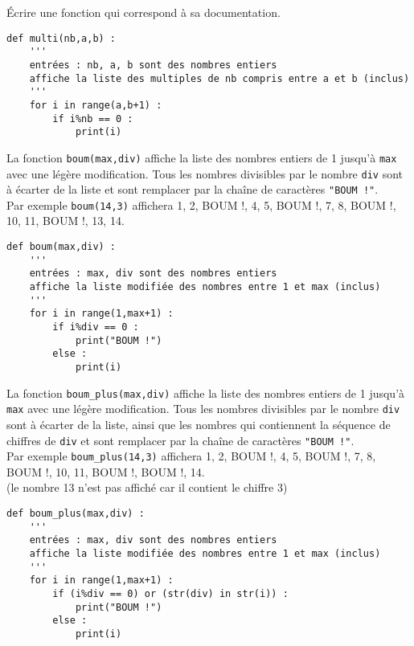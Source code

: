 \begin{cor}
\begin{multicols}{2}
Écrire une fonction qui correspond à sa documentation.\\
\columnbreak
\begin{lstlisting}
def multi(nb,a,b) :
	'''
	entrées : nb, a, b sont des nombres entiers
	affiche la liste des multiples de nb compris entre a et b (inclus)
	'''
	for i in range(a,b+1) :
		if i%nb == 0 :
			print(i)
\end{lstlisting}
\end{multicols}
\end{cor}

\begin{cor}[1 2 3 BOUM! (*)]
\begin{multicols}{2}
La fonction \texttt{boum(max,div)} affiche la liste des nombres entiers de 1 jusqu'à \texttt{max} avec une légère modification. Tous les nombres divisibles par le nombre \texttt{div} sont à écarter de la liste et sont remplacer par la chaîne de caractères \texttt{"BOUM !"}.\\
Par exemple \texttt{boum(14,3)} affichera 1, 2, BOUM !, 4, 5, BOUM !, 7, 8, BOUM !, 10, 11, BOUM !, 13, 14.\\
\columnbreak
\begin{lstlisting}
def boum(max,div) :
	'''
	entrées : max, div sont des nombres entiers
	affiche la liste modifiée des nombres entre 1 et max (inclus)
	'''
	for i in range(1,max+1) :
		if i%div == 0 :
			print("BOUM !")
		else :
			print(i)
\end{lstlisting}
\end{multicols}
\end{cor}

\begin{cor}[1 2 3 BOUM! (***)]
\begin{multicols}{2}
La fonction \texttt{boum\_plus(max,div)} affiche la liste des nombres entiers de 1 jusqu'à \texttt{max} avec une légère modification. Tous les nombres divisibles par le nombre \texttt{div} sont à écarter de la liste, ainsi que les nombres qui contiennent la séquence de chiffres de \texttt{div} et sont remplacer par la chaîne de caractères \texttt{"BOUM !"}.\\
Par exemple \texttt{boum\_plus(14,3)} affichera 1, 2, BOUM !, 4, 5, BOUM !, 7, 8, BOUM !, 10, 11, BOUM !, BOUM !, 14.\\
(le nombre 13 n'est pas affiché car il contient le chiffre 3)\\
\columnbreak
\begin{lstlisting}
def boum_plus(max,div) :
	'''
	entrées : max, div sont des nombres entiers
	affiche la liste modifiée des nombres entre 1 et max (inclus)
	'''
	for i in range(1,max+1) :
		if (i%div == 0) or (str(div) in str(i)) :
			print("BOUM !")
		else :
			print(i)
\end{lstlisting}
\end{multicols}
\end{cor}


